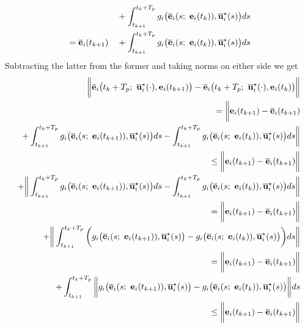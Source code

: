 \begin{gg_box}
\begin{alignat}{2}
    &                      &&+ \int_{t_{k+1}}^{t_k + T_p} g_i\big(\overline{\vect{e}}_i(s;\ \vect{e}_i(t_k)), \overline{\vect{u}}_i^{\star}(s) \big)ds \\
    &= \overline{\vect{e}}_i(t_{k+1}) &&+ \int_{t_{k+1}}^{t_k + T_p} g_i\big(\overline{\vect{e}}_i(s;\ \vect{e}_i(t_k)), \overline{\vect{u}}_i^{\star}(s) \big)ds \\
\end{alignat}
Subtracting the latter from the former and taking norms on either side we get
\begin{alignat}{2}
  \bigg \|\overline{\vect{e}}_i\big(t_k + T_p;\ \overline{\vect{u}}_i^{\star}(\cdot), \vect{e}_i(t_{k+1})\big)
    - \overline{\vect{e}}_i\big(t_k + T_p;\ \overline{\vect{u}}_i^{\star}(\cdot), \vect{e}_i(t_k)\big) \bigg\| \\
  = \bigg \| \vect{e}_i(t_{k+1}) - \overline{\vect{e}}_i(t_{k+1}) \\
  + \int_{t_{k+1}}^{t_k + T_p} g_i\big(\overline{\vect{e}}_i(s;\ \vect{e}_i(t_{k+1})), \overline{\vect{u}}_i^{\star}(s) \big)ds
    - \int_{t_{k+1}}^{t_k + T_p} g_i\big(\overline{\vect{e}}_i(s;\ \vect{e}_i(t_k)), \overline{\vect{u}}_i^{\star}(s) \big)ds \bigg \| \\
  \leq \bigg \| \vect{e}_i(t_{k+1}) - \overline{\vect{e}}_i(t_{k+1}) \bigg\| \\
  + \bigg \| \int_{t_{k+1}}^{t_k + T_p} g_i\big(\overline{\vect{e}}_i(s;\ \vect{e}_i(t_{k+1})), \overline{\vect{u}}_i^{\star}(s) \big)ds
    - \int_{t_{k+1}}^{t_k + T_p} g_i\big(\overline{\vect{e}}_i(s;\ \vect{e}_i(t_k)), \overline{\vect{u}}_i^{\star}(s) \big)ds \bigg \| \\
  = \bigg \| \vect{e}_i(t_{k+1}) - \overline{\vect{e}}_i(t_{k+1}) \bigg\| \\
  + \bigg \| \int_{t_{k+1}}^{t_k + T_p} \bigg( g_i\big(\overline{\vect{e}}_i(s;\ \vect{e}_i(t_{k+1})), \overline{\vect{u}}_i^{\star}(s) \big)
  -  g_i\big(\overline{\vect{e}}_i(s;\ \vect{e}_i(t_k)), \overline{\vect{u}}_i^{\star}(s) \big) \bigg) ds \bigg \| \\
  = \bigg \| \vect{e}_i(t_{k+1}) - \overline{\vect{e}}_i(t_{k+1}) \bigg\| \\
  +  \int_{t_{k+1}}^{t_k + T_p} \bigg\| g_i\big(\overline{\vect{e}}_i(s;\ \vect{e}_i(t_{k+1})), \overline{\vect{u}}_i^{\star}(s) \big)
  -  g_i\big(\overline{\vect{e}}_i(s;\ \vect{e}_i(t_k)), \overline{\vect{u}}_i^{\star}(s) \big) \bigg\| ds \\
  \leq \bigg \| \vect{e}_i(t_{k+1}) - \overline{\vect{e}}_i(t_{k+1}) \bigg\| \\

\end{alignat}
\end{gg_box}
